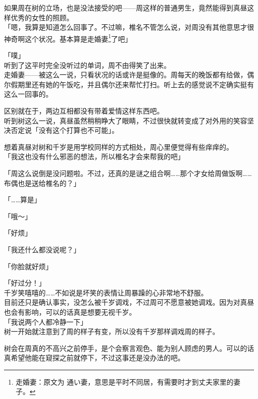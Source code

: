 如果周在树的立场，也是没法接受的吧——周这样的普通男生，竟然能得到真昼这样优秀的女性的照顾。\\

「嗯，我算是知道怎么回事了。不过嘛，椎名不管怎么说，对周没有其他意思才很神奇啊这个状况。基本算是走婚妻\footnote{走婚妻：原文为 {\jpfont 通い妻}，意思是平时不同居，有需要时才到丈夫家里的妻子。}了吧」

「噗」\\

听到了这平时完全没听过的单词，周不由得笑了出来。\\

走婚妻——被这么一说，只看状况的话或许是挺像的。周每天的晚饭都有给做，偶尔假期里还有她的午饭吃，并且偶尔还来帮忙打扫。听上去的感觉说不定确实挺有这么一回事的。

区别就在于，两边互相都没有带着爱情这样东西吧。\\

听到树这么一说，真昼虽然稍稍睁大了眼睛，不过很快就转变成了对外用的笑容坚决否定说「没有这个打算也不可能」。

想着真昼对树和千岁是用学校同样的方式相处，周心里便觉得有些痒痒的。\\

「我这也没有什么邪恶的想法，所以椎名才会来帮我的吧」

「周这么说倒是没问题啦。不过，还真的是谜之组合啊……那个才女给周做饭啊……布偶也是送给椎名的？」

「……算是」

「哦～」

「好烦」

「我还什么都没说呢？」

「你脸就好烦」

「好过分！」\\

千岁笑嘻嘻的……不如说是坏笑的表情让周暴躁的心非常地不舒服。\\

目前还只是确认事实，没怎么被千岁调戏，不过周可不愿意被她调戏。因为对真昼也会有影响，可以的话真是想要无视千岁。\\

「我说两个人都冷静一下」\\

树一开始就注意到了周的样子有变，所以没有千岁那样调戏周的样子。

树会在周真的不高兴之前停手，是个会察言观色、能为别人顾虑的男人。可以的话真希望他能在窥探之前就停下，不过这事还是没办法的吧。\\

